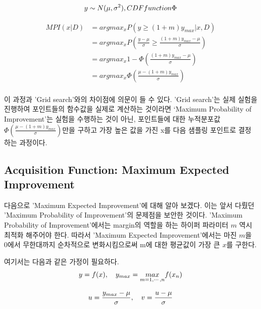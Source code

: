 \documentclass[a4paper]{oblivoir}
\begin{document}
\begin{equation}
y \sim N(\mu, \sigma^{2}),\space CDF function \space\Phi 
\label{eq:12-38}
\end{equation}

\begin{align*}
MPI(x|D)&=argmax_{x}P(y \geq(1+m)y_{max}|x,D) \\
&=argmax_{x}P(\frac{y-\mu}{\sigma} \geq\frac{(1+m)y_{max}-\mu}{\sigma}) \\
&=argmax_{x}{1-\Phi(\frac{(1+m)y_{max}-\mu}{\sigma})} \\
&=argmax_{x}\Phi(\frac{\mu-(1+m)y_{max}}{\sigma}) \\
\label{eq:12-39}
\end{align*}

이 과정과 'Grid search'와의 차이점에 의문이 들 수 있다. 'Grid search'는 실제 실험을 진행하여 포인트들의 함수값을 실제로 계산하는 것이라면 ‘Maximum Probability of Improvement’는 실험을 수행하는 것이 아닌, 포인트들에 대한 누적분포값 $\Phi(\frac{\mu-(1+m)y_{max}}{\sigma})$만을 구하고 가장 높은 값을 가진 x를 다음 샘플링 포인트로 결정하는 과정이다.\\

\subsection{Acquisition Function: Maximum Expected Improvement}

다음으로 'Maximum Expected Improvement'에 대해 알아 보겠다. 이는 앞서 다뤘던 'Maximum Probability of Improvement'의 문제점을 보안한 것이다. 'Maximum Probability of Improvement'에서는 margin의 역할을 하는 하이퍼 파라미터 $m$ 역시 최적화 해주어야 한다. 따라서 'Maximum Expected Improvement'에서는 마진 $m$을 0에서 무한대까지 순차적으로 변화시킴으로써 m에 대한 평균값이 가장 큰 $x$를 구한다.

여기서는 다음과 같은 가정이 필요하다.
\begin{equation}
y =f(x), \quad y_{max} = \underset{m = 1,\cdots,n}{max}f(x_{n})\nonumber\\
\label{eq:12-40}
\end{equation}

\begin{equation}
u =\frac{y_{max}-\mu}{\sigma}, \quad v =\frac{u-\mu}{\sigma}\nonumber\\
\label{eq:12-41}
\end{equation}
\end{document}

